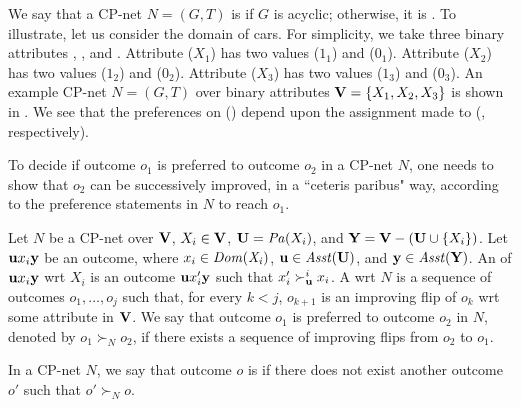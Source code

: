 We say that a CP-net $N=(G,T)$ is  if
$G$ is acyclic; otherwise, it is .
To illustrate, let us consider the domain of cars.
For simplicity, we take three binary attributes
, , and .
Attribute  ($X_1$) has two values  ($1_1$) 
and  ($0_1$).
Attribute  ($X_2$) has two values  ($1_2$) 
and  ($0_2$).
Attribute  ($X_3$) has two values  ($1_3$) 
and  ($0_3$).
An example CP-net $N=(G,T)$ over binary attributes $\textbf{V}=\{X_1,X_2,X_3\}$
is shown in .
We see that the preferences on  () 
depend upon the assignment made
to  (, respectively).

To decide if outcome $o_1$ is preferred to outcome $o_2$ in a CP-net $N$,
one needs to show that $o_2$ can be successively improved, 
in a ``ceteris paribus" way, 
according to the preference statements in $N$ to reach $o_1$.

\begin{definition}
	Let $N$ be a CP-net over $\textbf{V}$, $X_i \in \textbf{V}$, $\textbf{U} = \mathit{Pa}(X_i)$,
	and $\textbf{Y}=\textbf{V}-(\textbf{U} \cup \{X_i\})$.
	Let $\textbf{u} x_i \textbf{y}$ be an outcome, where $x_i\in \it{Dom}(X_i)$,
	$\textbf{u} \in \mathit{Asst}(\textbf{U})$, and $\textbf{y} \in \mathit{Asst}(\textbf{Y})$.
	An  of $\textbf{u} x_i \textbf{y}$ wrt $X_i$ is an
	outcome $\textbf{u} x_i' \textbf{y}$ such that $x_i' \succ^i_{\textbf{u}} x_i$.
	A  wrt $N$ is a sequence of
	outcomes $o_1,\ldots,o_j$ such that, for every $k<j$,
	$o_{k+1}$ is an improving flip of $o_k$ wrt some attribute in $\textbf{V}$.
	We say that outcome $o_1$ is preferred to outcome $o_2$ in $N$,
	denoted by $o_1 \succ_N o_2$, if there exists a sequence of
	improving flips from $o_2$ to $o_1$.
\end{definition}

In a CP-net $N$, we say that outcome $o$ is  if
there does not exist another outcome $o'$ such that
$o' \succ_N o$.


